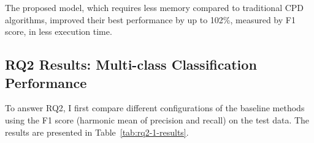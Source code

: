 \begin{rqanswer}
The proposed model, which requires less memory compared to traditional CPD algorithms, improved their best performance by up to 102\%, measured by F1 score, in less execution time.
\end{rqanswer}

\subsection{RQ2 Results: Multi-class Classification Performance}
To answer RQ2, I first compare different configurations of the baseline methods using the F1 score (harmonic mean of precision and recall) on the test data. The results are presented in Table~\ref{tab:rq2-1-results}.

\begin{table}
\caption{Precision, recall, and F1 score of ridge classifiers (linear classifiers with L2 regularization) and decision tree classifiers (DT) with different sliding window widths ($w$). For each algorithm on each $w$ several hyper-parameters were applied producing 152 different models. In this table, I only show the results of the best performing model in each group.}
\label{tab:rq2-1-results}
\end{table}
